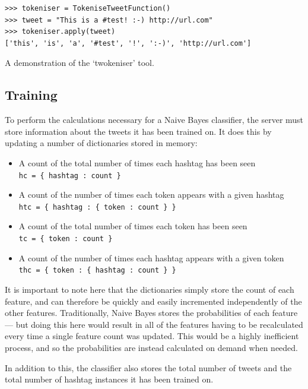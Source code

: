 \documentclass[11pt,a4paper]{report}
\begin{document}
\begin{listing}[htpb]
    \begin{verbatim}
>>> tokeniser = TokeniseTweetFunction()
>>> tweet = "This is a #test! :-) http://url.com"
>>> tokeniser.apply(tweet)
['this', 'is', 'a', '#test', '!', ':-)', 'http://url.com']
    \end{verbatim}
    \caption{A demonstration of the `twokeniser' tool.}
    \label{lst:twokeniser}
\end{listing}


\subsection{Training}
To perform the calculations necessary for a Naive Bayes classifier, the server must store information about the tweets it has been trained on. It does this by updating a number of dictionaries stored in memory:

\begin{itemize}
    \item A count of the total number of times each hashtag has been seen\\
        \verb+hc = { hashtag : count }+
    \item A count of the number of times each token appears with a given hashtag\\
        \verb+htc = { hashtag : { token : count } }+
    \item A count of the total number of times each token has been seen\\
        \verb+tc = { token : count }+
    \item A count of the number of times each hashtag appears with a given token\\
        \verb+thc = { token : { hashtag : count } }+
\end{itemize}

It is important to note here that the dictionaries simply store the count of each feature, and can therefore be quickly and easily incremented independently of the other features. Traditionally, Naive Bayes stores the probabilities of each feature --- but doing this here would result in all of the features having to be recalculated every time a single feature count was updated. This would be a highly inefficient process, and so the probabilities are instead calculated on demand when needed.

In addition to this, the classifier also stores the total number of tweets and the total number of hashtag instances it has been trained on.
\end{document}
